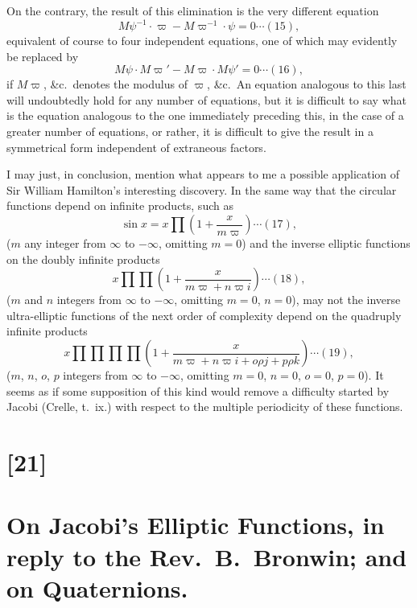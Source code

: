\documentclass[12pt,a4paper]{article}
\begin{document}
On the contrary, the result of this elimination is the very different equation
\begin{equation}
M\psi^{-1} \cdot \varpi - M\varpi^{-1} \cdot \psi = 0 \cdots (15),
\end{equation}
equivalent of course to four independent equations, one of which may evidently be
replaced by
\begin{equation}
M\psi \cdot M\varpi' - M\varpi \cdot M\psi' = 0 \cdots (16),
\end{equation}
if $M\varpi$, \&c.\ denotes the modulus of $\varpi$, \&c.\ An equation analogous to this last will
undoubtedly hold for any number of equations, but it is difficult to say what is the
equation analogous to the one immediately preceding this, in the case of a greater
number of equations, or rather, it is difficult to give the result in a symmetrical form
independent of extraneous factors.

I may just, in conclusion, mention what appears to me a possible application of
Sir William Hamilton's interesting discovery. In the same way that the circular
functions depend on infinite products, such as
\begin{equation}
\sin x = x \prod \left(1 + \frac{x}{m\varpi}\right) \cdots (17),
\end{equation}
($m$ any integer from $\infty$ to $-\infty$, omitting $m = 0$)
and the inverse elliptic functions on the doubly infinite products
\begin{equation}
x \prod \prod \left(1 + \frac{x}{m\varpi + n\varpi i}\right) \cdots (18),
\end{equation}
($m$ and $n$ integers from $\infty$ to $-\infty$, omitting $m = 0$, $n = 0$),
may not the inverse ultra-elliptic functions of the next order of complexity depend on
the quadruply infinite products
\begin{equation}
x \prod \prod \prod \prod \left(1 + \frac{x}{m\varpi + n\varpi i + o\rho j + p\rho k}\right) \cdots (19),
\end{equation}
($m$, $n$, $o$, $p$ integers from $\infty$ to $-\infty$, omitting $m = 0$, $n = 0$, $o = 0$, $p = 0$).
It seems as if some supposition of this kind would remove a difficulty started by
Jacobi (Crelle, t.~ix.) with respect to the multiple periodicity of these functions.

\newpage
\section*{[21]}
\section*{On Jacobi's Elliptic Functions, in reply to the Rev.~B.~Bronwin; and on Quaternions.}
\end{document}
